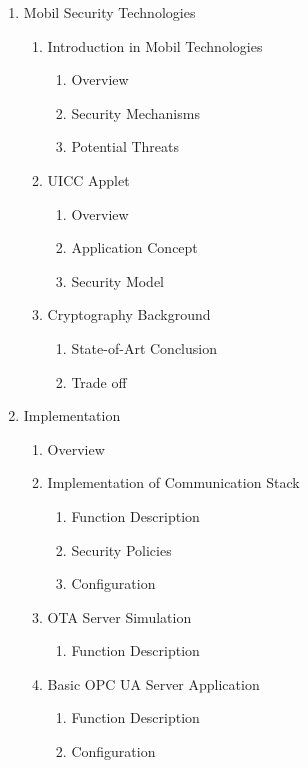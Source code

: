 \documentclass[]{llncs}
\begin{document}
\begin{enumerate}
\begin{enumerate}[label*=\arabic*.]
\begin{enumerate}[label*=\arabic*.]
		\end{enumerate}
	\end{enumerate}
	\item Mobil Security Technologies
  	\begin{enumerate}[label*=\arabic*.]
    	\item Introduction in Mobil Technologies
		\begin{enumerate}[label*=\arabic*.]
		\item Overview
		\item Security Mechanisms
		\item Potential Threats
		\end{enumerate}
    	\item UICC Applet
		\begin{enumerate}[label*=\arabic*.]
		\item Overview
		\item Application Concept
		\item Security Model
		\end{enumerate}
    	\item Cryptography Background
		\begin{enumerate}[label*=\arabic*.]
		\item State-of-Art Conclusion
		\item Trade off
		\end{enumerate}
	\end{enumerate}
	\item Implementation 
  	\begin{enumerate}[label*=\arabic*.]
	\item Overview
    	\item Implementation of Communication Stack
		\begin{enumerate}[label*=\arabic*.]
		\item Function Description
		\item Security Policies
		\item Configuration
		\end{enumerate}
    	\item OTA Server Simulation 
		\begin{enumerate}[label*=\arabic*.]
		\item Function Description
		\end{enumerate}
    	\item Basic OPC UA Server Application
		\begin{enumerate}[label*=\arabic*.]
		\item Function Description
		\item Configuration

\end{enumerate}
\end{enumerate}
\end{enumerate}
\end{document}

